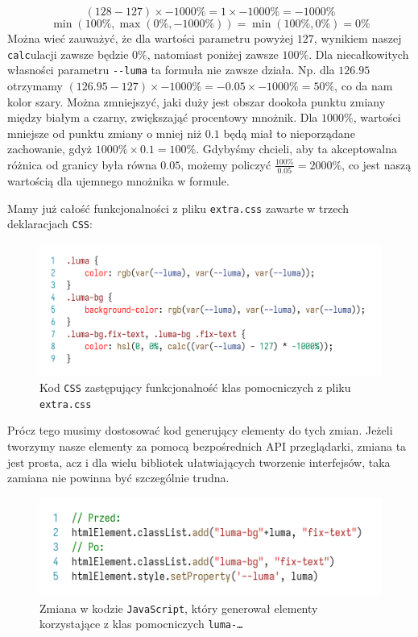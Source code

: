 \documentclass[licencjacka]{pracadypl}
\begin{document}
\[
  \left(128-127\right) \times -1000\% = 1 \times -1000\% = -1000\%
\]
\[
  \min\left(100\%, \max\left(0\%, -1000\%\right)\right) = \min\left(100\%, 0\%\right) = 0\%
\]
Można wieć zauważyć, że dla wartości parametru powyżej $127$, wynikiem naszej \texttt{calc}ulacji zawsze będzie $0\%$, natomiast poniżej zawsze $100\%$. Dla niecałkowitych własności parametru \texttt{-\.-luma} ta formuła nie zawsze działa. Np. dla $126.95$ otrzymamy $\left(126.95-127\right)\times-1000\% = -0.05 \times -1000\% = 50\%$, co da nam kolor szary. Można zmniejszyć, jaki duży jest obszar dookoła punktu zmiany między białym a czarny, zwiększająć procentowy mnożnik. Dla $1000\%$, wartości mniejsze od punktu zmiany o mniej niż $0.1$ będą miał to nieporządane zachowanie, gdyż $1000\%\times0.1 = 100\%$. Gdybyśmy chcieli, aby ta akceptowalna różnica od granicy była równa $0.05$, możemy policzyć $\frac{100\%}{0.05} = 2000\%$, co jest naszą wartością dla ujemnego mnożnika w formule.

Mamy już całość funkcjonalności z pliku \texttt{extra.css} zawarte w trzech deklaracjach \texttt{CSS}:

\begin{figure}[H]
  \centering
  \includegraphics[width=\linewidth]{images/code-css-luma-all.png}
  \caption{Kod \texttt{CSS} zastępujący funkcjonalność klas pomocniczych z pliku \texttt{extra.css}}
  \label{fig:css-css-luma-all}
\end{figure}

Prócz tego musimy dostosować kod generujący elementy do tych zmian. Jeżeli tworzymy nasze elementy za pomocą bezpośrednich API przeglądarki, zmiana ta jest prosta, acz i dla wielu bibliotek ułatwiających tworzenie interfejsów, taka zamiana nie powinna być szczególnie trudna.

\begin{figure}[H]
  \centering
  \includegraphics[width=\linewidth]{images/code-js-luma-adjust.png}
  \caption{Zmiana w kodzie \texttt{JavaScript}, który generował elementy korzystające z klas pomocniczych \texttt{luma-\dots}}
  \label{fig:code-js-luma-adjust}
\end{figure}
\end{document}
